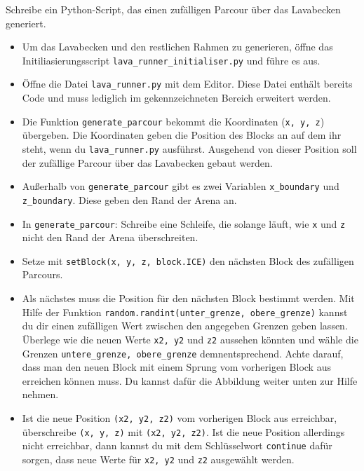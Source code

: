 \large Schreibe ein Python-Script, das einen zufälligen Parcour über das Lavabecken generiert.
\begin{itemize}
	\item Um das Lavabecken und den restlichen Rahmen zu generieren, öffne das Initiliasierungsscript \texttt{lava\_runner\_initialiser.py} und führe es aus.
	
	\item Öffne die Datei \texttt{lava\_runner.py} mit dem Editor. Diese Datei enthält bereits Code und muss lediglich im gekennzeichneten Bereich erweitert werden.
	
	\item Die Funktion \texttt{generate\_parcour} bekommt die Koordinaten (\texttt{x, y, z}) übergeben. Die Koordinaten geben die Position des Blocks an auf dem ihr steht, wenn du \texttt{lava\_runner.py} ausführst. Ausgehend von dieser Position soll der zufällige Parcour über das Lavabecken gebaut werden.
	
	\item Außerhalb von \texttt{generate\_parcour} gibt es zwei Variablen \texttt{x\_boundary} und \texttt{z\_boundary}. Diese geben den Rand der Arena an.
	
	\item In \texttt{generate\_parcour}: Schreibe eine Schleife, die solange läuft, wie \texttt{x} und \texttt{z} nicht den Rand der Arena überschreiten.
	
	\item  Setze mit \texttt{setBlock(x, y, z, block.ICE)} den nächsten Block des zufälligen Parcours.
	
	\item Als nächstes muss die Position für den nächsten Block bestimmt werden. Mit Hilfe der Funktion \texttt{random.randint(unter\_grenze, obere\_grenze)} kannst du dir einen zufälligen Wert zwischen den angegeben Grenzen geben lassen. Überlege wie die neuen Werte \texttt{x2, y2} und \texttt{z2} aussehen könnten und wähle die Grenzen \texttt{untere\_grenze, obere\_grenze} demnentsprechend. Achte darauf, dass man den neuen Block mit einem Sprung vom vorherigen Block aus erreichen können muss. Du kannst dafür die Abbildung weiter unten zur Hilfe nehmen.
	
	\item Ist die neue Position \texttt{(x2, y2, z2)} vom vorherigen Block aus erreichbar, überschreibe \texttt{(x, y, z)} mit \texttt{(x2, y2, z2)}. Ist die neue Position allerdings nicht erreichbar, dann kannst du mit dem Schlüsselwort \texttt{continue} dafür sorgen, dass neue Werte für \texttt{x2, y2} und \texttt{z2} ausgewählt werden.

\end{itemize}
